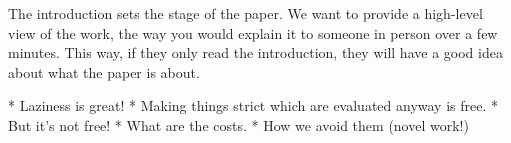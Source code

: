 The introduction sets the stage of the paper.
We want to provide a high-level view of the work, the way you would explain it to someone in person over a few minutes.
This way, if they only read the introduction, they will have a good idea about what the paper is about.

* Laziness is great!
* Making things strict which are evaluated anyway is free.
* But it's not free!
* What are the costs.
* How we avoid them (novel work!)

